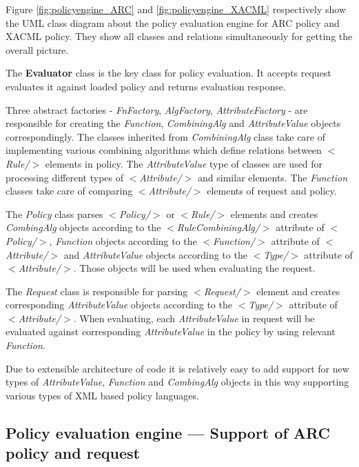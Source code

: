 \documentclass{article}                            %
\begin{document}
Figure \ref{fig:policyengine_ARC} and \ref{fig:policyengine_XACML} respectively show the UML class diagram about the policy evaluation engine for ARC policy and XACML policy. They show all classes and relations simultaneously for getting the overall picture. 


The \textbf{Evaluator} class is the key class for policy evaluation. It accepts request evaluates it against loaded policy and returns evaluation response.

Three abstract factories - \textit{FnFactory}, \textit{AlgFactory}, \textit{AttributeFactory} - are responsible for creating the \textit{Function}, \textit{CombiningAlg} and \textit{AttributeValue} objects correspondingly. The classes inherited from \textit{CombiningAlg} class take care of implementing various combining algorithms which define relations between \textit{$<$Rule/$>$} elements in policy. The \textit{AttributeValue} type of classes are used for processing different types of \textit{$<$Attribute/$>$} and similar elements. The \textit{Function} classes take care of comparing \textit{$<$Attribute/$>$} elements of request and policy. 

The \textit{Policy} class parses \textit{$<$Policy/$>$} or \textit{$<$Rule/$>$} elements and creates \textit{CombingAlg} objects according to the \textit{$<$RuleCombiningAlg/$>$} attribute of \textit{$<$Policy/$>$}, \textit{Function} objects according to the \textit{$<$Function/$>$} attribute of \textit{$<$Attribute/$>$} and \textit{AttributeValue} objects according to the \textit{$<$Type/$>$} attribute of \textit{$<$Attribute/$>$}. Those objects will be used when evaluating the request.

The \textit{Request} class is responsible for parsing \textit{$<$Request/$>$} element and creates corresponding \textit{AttributeValue} objects according to the \textit{$<$Type/$>$} attribute of \textit{$<$Attribute/$>$}. When evaluating, each \textit{AttributeValue} in request will be evaluated against corresponding \textit{AttributeValue} in the policy by using relevant \textit{Function}.

Due to extensible architecture of code it is relatively easy to add support for new types of \textit{AttributeValue}, \textit{Function} and \textit{CombingAlg} objects in this way supporting various types of XML based policy languages.

\subsection{Policy evaluation engine --- Support of ARC policy and request} %
\label{subsec:policy_engine_arc}
\end{document}
